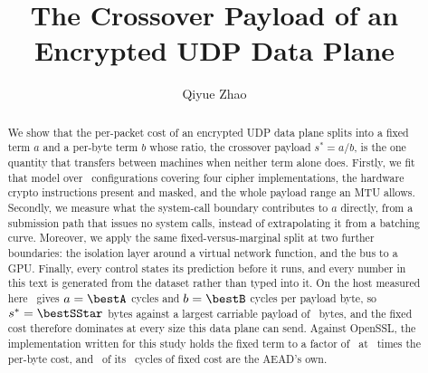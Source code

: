 \documentclass[sigconf,nonacm]{acmart}
\begin{document}
\title{The Crossover Payload of an Encrypted UDP Data Plane}

\author{Qiyue Zhao}

\begin{abstract}
We show that the per-packet cost of an encrypted UDP data plane splits into a
fixed term $a$ and a per-byte term $b$ whose ratio, the crossover payload
$s^{*}=a/b$, is the one quantity that transfers between machines when neither
term alone does. Firstly, we fit that model over \eOneUnits\ configurations
covering four cipher implementations, the hardware crypto instructions present
and masked, and the whole payload range an MTU allows. Secondly, we measure what
the system-call boundary contributes to $a$ directly, from a submission path
that issues no system calls, instead of extrapolating it from a batching curve.
Moreover, we apply the same fixed-versus-marginal split at two further
boundaries: the isolation layer around a virtual network function, and the bus
to a GPU. Finally, every control states its prediction before it runs, and every
number in this text is generated from the dataset rather than typed into it. On
the host measured here \bestCipher\ gives $a=\bestA$ cycles and $b=\bestB$
cycles per payload byte, so $s^{*}=\bestSStar$ bytes against a largest carriable
payload of \protoMaxPayload\ bytes, and the fixed cost therefore dominates at
every size this data plane can send. Against OpenSSL, the implementation written
for this study holds the fixed term to a factor of \simdVsOpensslA\ at
\simdVsOpensslB\ times the per-byte cost, and \ctlAEADOnlyFixed\ of its
\ctlAEADFixed\ cycles of fixed cost are the AEAD's own.
\end{abstract}


\maketitle











\balance


\end{document}
